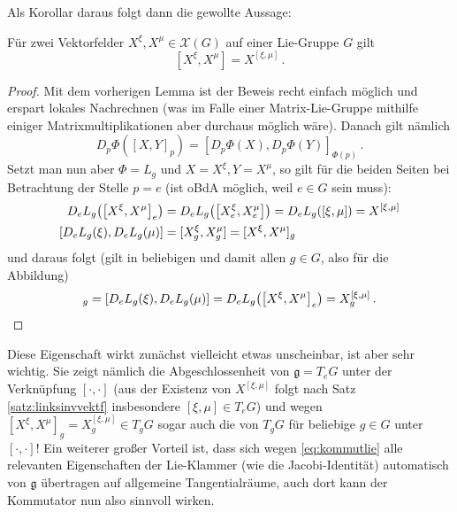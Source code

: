 \documentclass[../H_Analysis_main.tex]{subfiles}
\begin{document}
Als Korollar daraus folgt dann die gewollte Aussage:
\begin{cor}
Für zwei Vektorfelder $X^\xi, X^\mu \in \mathcal{X}(G)$ auf einer Lie-Gruppe $G$ gilt
\begin{equation}\label{eq:kommutlie}
[X^\xi, X^\mu] = X^{[\xi, \mu]} \, .
\end{equation}
\end{cor}
\begin{proof}
Mit dem vorherigen Lemma ist der Beweis recht einfach möglich und erspart lokales Nachrechnen (was im Falle einer Matrix-Lie-Gruppe mithilfe einiger Matrixmultiplikationen aber durchaus möglich wäre). Danach gilt nämlich
\begin{equation*}
D_p \Phi([X, Y]_p) = [D_p \Phi(X), D_p \Phi(Y)]_{\Phi(p)} \, .
\end{equation*}
Setzt man nun aber $\Phi = L_g$ und $X = X^\xi, Y = X^\mu$, so gilt für die beiden Seiten bei Betrachtung der Stelle $p = e$ (ist oBdA möglich, weil $e \in G$ sein muss):
\begin{align*}
D_e L_g\qty(\qty[X^\xi, X^\mu]_e) &= D_e L_g\qty(\qty[X^\xi_e, X^\mu_e]) = D_e L_g\qty(\qty[\xi, \mu]) = X^{[\xi, \mu]}
\\
[D_e L_g (\xi), D_e L_g (\mu)] &= [X^\xi_g, X^\mu_g] = [X^\xi, X^\mu]_g
\end{align*}
und daraus folgt (gilt in beliebigen und damit allen $g \in G$, also für die Abbildung)
\begin{equation*}
[X^\xi, X^\mu]_g = [D_e L_g (\xi), D_e L_g (\mu)] = D_e L_g\qty(\qty[X^\xi, X^\mu]_e) = X^{[\xi, \mu]}_g \, . \qedhere
\end{equation*}
\end{proof}


Diese Eigenschaft wirkt zunächst vielleicht etwas unscheinbar, ist aber sehr wichtig. Sie zeigt nämlich die Abgeschlossenheit von $\mathfrak{g} = T_e G$ unter der Verknüpfung $[\cdot, \cdot]$ (aus der Existenz von $X^{[\xi, \mu]}$ folgt nach Satz \ref{satz:linksinvvektf} insbesondere $[\xi, \mu] \in T_e G$) und wegen $[X^\xi, X^\mu]_g = X^{[\xi, \mu]}_g \in T_g G$ sogar auch die von $T_g G$ für beliebige $g \in G$ unter $[\cdot, \cdot]$! Ein weiterer großer Vorteil ist, dass sich wegen \eqref{eq:kommutlie} alle relevanten Eigenschaften der Lie-Klammer (wie die Jacobi-Identität) automatisch von $\mathfrak{g}$ übertragen auf allgemeine Tangentialräume, auch dort kann der Kommutator nun also sinnvoll wirken.
\end{document}
